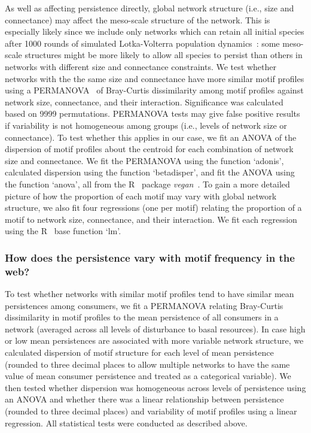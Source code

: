 \documentclass[12pt]{article}
\begin{document}
\begin{spacing}{2.0}
            As well as affecting persistence directly, global network structure (i.e., size and connectance) may affect the meso-scale structure of the network.
            This is especially likely since we include only networks which can retain all initial species after 1000 rounds of simulated Lotka-Volterra population dynamics~\citep{Cirtwill2021_inprep}:  some meso-scale structures might be more likely to allow all species to persist than others in networks with different size and connectance constraints.
            We test whether networks with the the same size and connectance have more similar motif profiles using a PERMANOVA~\citep{Anderson2001} of Bray-Curtis dissimilarity among motif profiles against network size, connectance, and their interaction.
            Significance was calculated based on 9999 permutations.
            PERMANOVA tests may give false positive results if variability is not homogeneous among groups (i.e., levels of network size or connectance).
            To test whether this applies in our case, we fit an ANOVA of the dispersion of motif profiles about the centroid for each combination of network size and connectance. 
            We fit the PERMANOVA using the function `adonis', calculated dispersion using the function `betadisper', and fit the ANOVA using the function `anova', all from the R~\citep{R} package \emph{vegan}~\citep{vegan}.
            To gain a more detailed picture of how the proportion of each motif may vary with global network structure, we also fit four regressions (one per motif) relating the proportion of a motif to network size, connectance, and their interaction.
            We fit each regression using the R~\citep{R} base function `lm'.
            
        
        \subsubsection*{How does the persistence vary with motif frequency in the web?}

            To test whether networks with similar motif profiles tend to have similar mean persistences among consumers, we fit a PERMANOVA relating Bray-Curtis dissimilarity in motif profiles to the mean persistence of all consumers in a network (averaged across all levels of disturbance to basal resources).
            In case high or low mean persistences are associated with more variable network structure, we calculated dispersion of motif structure for each level of mean persistence (rounded to three decimal places to allow multiple networks to have the same value of mean consumer persistence and treated as a categorical variable). 
            We then tested whether dispersion was homogeneous across levels of persistence using an ANOVA and whether there was a linear relationship between persistence (rounded to three decimal places) and variability of motif profiles using a linear regression.
            All statistical tests were conducted as described above.
            

\end{spacing}
\end{document}
